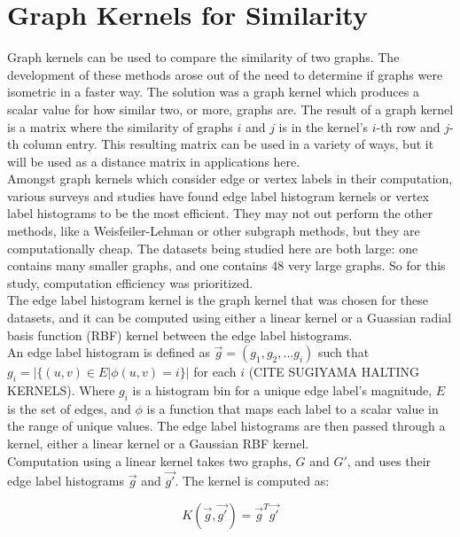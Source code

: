 %
%
%

\section{Graph Kernels for Similarity}

Graph kernels can be used to compare the similarity of two graphs. The development of these methods arose out of the need to determine if graphs were isometric in a faster way. The solution was a graph kernel which produces a scalar value for how similar two, or more, graphs are. The result of a graph kernel is a matrix where the similarity of graphs $i$ and $j$ is in the kernel's $i$-th row and $j$-th column entry. This resulting matrix can be used in a variety of ways, but it will be used as a distance matrix in applications here. \\

Amongst graph kernels which consider edge or vertex labels in their computation, various surveys and studies have found edge label histogram kernels or vertex label histograms to be the most efficient. They may not out perform the other methods, like a Weisfeiler-Lehman or other subgraph methods, but they are computationally cheap. The datasets being studied here are both large: one contains many smaller graphs, and one contains 48 very large graphs. So for this study, computation efficiency was prioritized. \\

The edge label histogram kernel is the graph kernel that was chosen for these datasets, and it can be computed using either a linear kernel or a Guassian radial basis function (RBF) kernel between the edge label histograms. \\
An edge label histogram is defined as $\vec{g} = (g_1,g_2, ... g_i)$ such that $g_i = | \{ (u,v) \in E | \phi(u,v) = i \} |$ for each $i$ (CITE SUGIYAMA HALTING KERNELS). Where $g_i$ is a histogram bin for a unique edge label's magnitude, $E$ is the set of edges, and $\phi$ is a function that maps each label to a scalar value in the range of unique values. The edge label histograms are then passed through a kernel, either a linear kernel or a Gaussian RBF kernel.\\
Computation using a linear kernel takes two graphs, $G$ and $G'$, and uses their edge label histograms $\vec{g}$ and $\vec{g'}$. The kernel is computed as:

$$K(\vec{g},\vec{g'}) = \vec{g}^{T}\vec{g'} $$

